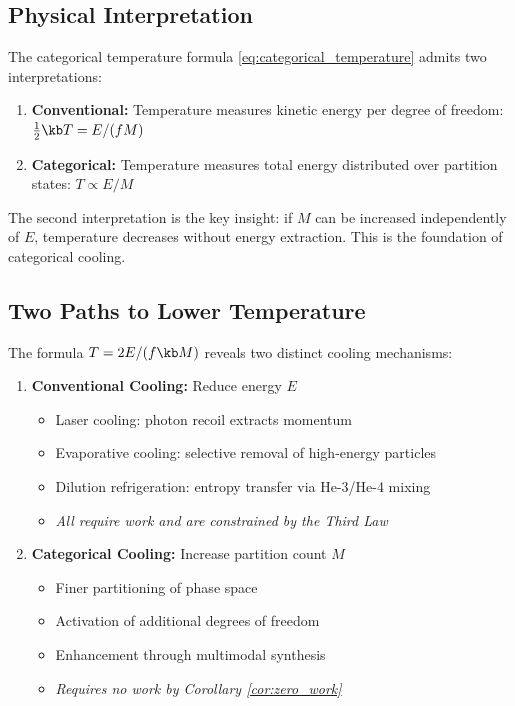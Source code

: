 \subsection{Physical Interpretation}

The categorical temperature formula \eqref{eq:categorical_temperature} admits two interpretations:

\begin{enumerate}
    \item \textbf{Conventional:} Temperature measures kinetic energy per degree of freedom: $\frac{1}{2}\kb T = E/(fM)$

    \item \textbf{Categorical:} Temperature measures total energy distributed over partition states: $T \propto E/M$
\end{enumerate}

The second interpretation is the key insight: if $M$ can be increased independently of $E$, temperature decreases without energy extraction. This is the foundation of categorical cooling.

\subsection{Two Paths to Lower Temperature}

The formula $T = 2E/(f\kb M)$ reveals two distinct cooling mechanisms:

\begin{enumerate}
    \item \textbf{Conventional Cooling:} Reduce energy $E$
    \begin{itemize}
        \item Laser cooling: photon recoil extracts momentum
        \item Evaporative cooling: selective removal of high-energy particles
        \item Dilution refrigeration: entropy transfer via He-3/He-4 mixing
        \item \textit{All require work and are constrained by the Third Law}
    \end{itemize}

    \item \textbf{Categorical Cooling:} Increase partition count $M$
    \begin{itemize}
        \item Finer partitioning of phase space
        \item Activation of additional degrees of freedom
        \item Enhancement through multimodal synthesis
        \item \textit{Requires no work by Corollary \ref{cor:zero_work}}
    \end{itemize}
\end{enumerate}

